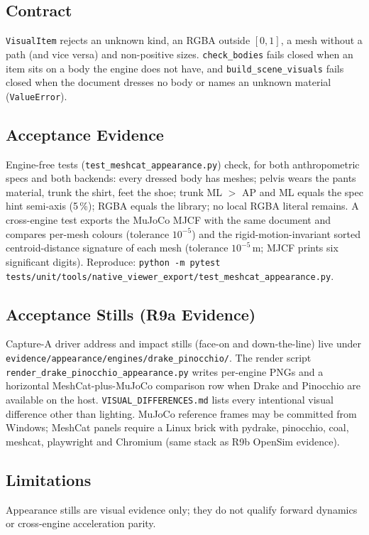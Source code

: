 \subsection{Contract}
\texttt{VisualItem} rejects an unknown kind, an RGBA outside $[0,1]$, a mesh
without a path (and vice versa) and non-positive sizes. \texttt{check\_bodies}
fails closed when an item sits on a body the engine does not have, and
\texttt{build\_scene\_visuals} fails closed when the document dresses no body
or names an unknown material (\texttt{ValueError}).

\subsection{Acceptance Evidence}
Engine-free tests (\texttt{test\_meshcat\_appearance.py}) check, for both
anthropometric specs and both backends: every dressed body has meshes; pelvis
wears the pants material, trunk the shirt, feet the shoe; trunk ML $>$ AP and
ML equals the spec hint semi-axis (5\,\%); RGBA equals the library; no local
RGBA literal remains. A cross-engine test exports the MuJoCo MJCF with the
same document and compares per-mesh colours (tolerance $10^{-5}$) and the
rigid-motion-invariant sorted centroid-distance signature of each mesh
(tolerance $10^{-5}$\,m; MJCF prints six significant digits).
Reproduce:
\texttt{python -m pytest tests/unit/tools/native\_viewer\_export/test\_meshcat\_appearance.py}.

\subsection{Acceptance Stills (R9a Evidence)}
Capture-A driver address and impact stills (face-on and down-the-line) live under
\texttt{evidence/appearance/engines/drake\_pinocchio/}. The render script
\texttt{render\_drake\_pinocchio\_appearance.py} writes per-engine PNGs and a
horizontal MeshCat-plus-MuJoCo comparison row when Drake and Pinocchio are
available on the host. \texttt{VISUAL\_DIFFERENCES.md} lists every intentional
visual difference other than lighting. MuJoCo reference frames may be committed
from Windows; MeshCat panels require a Linux brick with pydrake, pinocchio,
coal, meshcat, playwright and Chromium (same stack as R9b OpenSim evidence).

\subsection{Limitations}
Appearance stills are visual evidence only; they do not qualify forward
dynamics or cross-engine acceleration parity.
